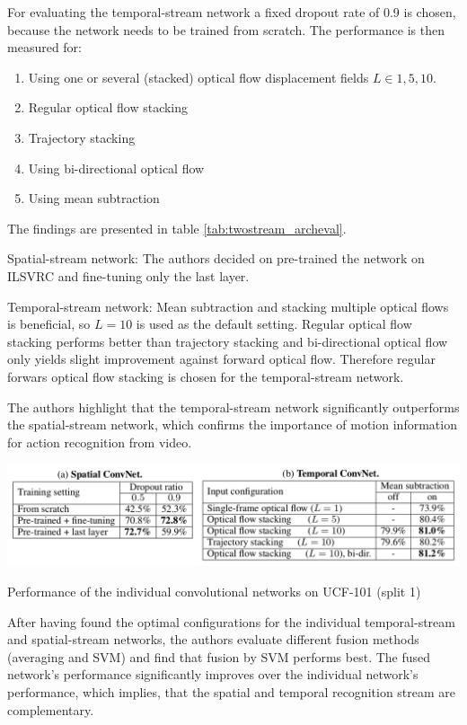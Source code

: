 For evaluating the temporal-stream network a fixed dropout rate of 0.9 is chosen, because the network needs to be trained from scratch. The performance is then measured for:
\begin{enumerate}
    \item Using one or several (stacked) optical flow displacement fields $L \in {1,5,10}$.
    \item Regular optical flow stacking
    \item Trajectory stacking
    \item Using bi-directional optical flow
    \item Using mean subtraction
\end{enumerate}

The findings are presented in table \ref{tab:twostream_archeval}.

Spatial-stream network: The authors decided on pre-trained the network on ILSVRC and fine-tuning only the last layer.

Temporal-stream network: Mean subtraction and stacking multiple optical flows is beneficial, so $L=10$ is used as the default setting. Regular optical flow stacking performs better than trajectory stacking and bi-directional optical flow only yields slight improvement against forward optical flow. Therefore regular forwars optical flow stacking is chosen for the temporal-stream network.

The authors highlight that the temporal-stream network significantly outperforms the spatial-stream network, which confirms the importance of motion information for action recognition from video.

\begin{table}[H]
    \centering
    \includegraphics[width=\textwidth]{img_deep/twostream_archeval}
    \caption{Performance of the individual convolutional networks on UCF-101 (split 1) \cite{simonyan_two-stream_2014}}
    \label{tab:twostream_archeval}
\end{table}

After having found the optimal configurations for the individual temporal-stream and spatial-stream networks, the authors evaluate different fusion methods (averaging and SVM) and find that fusion by SVM performs best. The fused network's performance significantly improves over the individual network's performance, which implies, that the spatial and temporal recognition stream are complementary.

